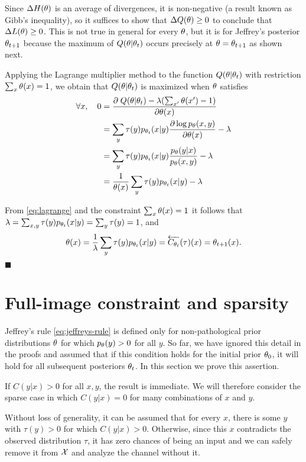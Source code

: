 \documentclass{article}
\begin{document}
Since $\Delta H({\theta})$ is an average of divergences, it is non-negative (a result known as Gibb's inequality), so it suffices to show that $\Delta Q({\theta})\geq 0$ to conclude that $\Delta L({\theta})\geq 0$.
This is not true in general for every ${\theta}$, but it is for Jeffrey's posterior ${{\theta}_{t+1}}$ because the maximum of $Q({\theta}|{{\theta}_t})$ occurs precisely at ${\theta}={{\theta}_{t+1}}$ as shown next.

Applying the Lagrange multiplier method to the function $Q({\theta}|{{\theta}_t})$ with restriction $\sum_x {\theta}(x)=1$, we obtain that $Q({\theta}|{{\theta}_t})$ is maximized when ${\theta}$ satisfies
\begin{align}
    \forall x,\hspace{1em} 0
    &=\frac{\partial\; Q({\theta}|{{\theta}_t})-\lambda (\sum_{x'} {\theta}(x')-1)}{\partial {\ensuremath{\theta}}(x)}
    \notag\\
    &= \sum_{y} \tau(y) {p_{{{\theta}_t}}}(x|y) \frac{\partial\log {p_{\ensuremath{\theta}}}(x,y)}{\partial {\ensuremath{\theta}}(x)} - \lambda
    \notag\\
    &= \sum_{y} \tau(y) {p_{{{\theta}_t}}}(x|y) \frac{{p_{\theta}}(y|x)}{{p_{\theta}}(x,y)} - \lambda
    \notag\\
    &= \frac{1}{{\theta}(x)} \sum_{y} \tau(y) {p_{{{\theta}_t}}}(x|y)  - \lambda
    \label{eq:lagrange}
\end{align}

From \eqref{eq:lagrange} and the constraint $\sum_x {\theta}(x)=1$ it follows that $\lambda=\sum_{x,y} \tau(y) {p_{{{\theta}_t}}}(x|y) = \sum_{y} \tau(y) = 1$, and
\begin{equation}
    \px(x) = \frac{1}{\lambda} \sum_{y} \tau(y) \ppxt(x|y)
    = \Cbwd[\pxt](\tau)(x)
    = \pxtt(x). 
\end{equation}
\hfill$\blacksquare$

\section{Full-image constraint and sparsity}

Jeffrey's rule \eqref{eq:jeffreys-rule} is defined only for non-pathological prior distributions ${\theta}$ for which ${p_{\theta}}(y)>0$ for all $y$.
So far, we have ignored this detail in the proofs and assumed that if this condition holds for the initial prior ${\theta}_0$, it will hold for all subsequent posteriors ${\theta}_t$.
In this section we prove this assertion.

If $C(y|x)>0$ for all $x,y$, the result is immediate.
We will therefore consider the sparse case in which $C(y|x)=0$ for many combinations of $x$ and $y$.

Without loss of generality, it can be assumed that for every $x$, there is some $y$ with $\tau(y)>0$ for which $C(y|x)>0$.
Otherwise, since this $x$ contradicts the observed distribution $\tau$, it has zero chances of being an input and we can safely remove it from ${\mathcal{X}}$ and analyze the channel without it.
\end{document}
